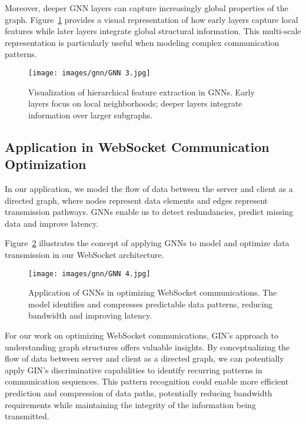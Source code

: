 \documentclass[a4paper, 11pt, twoside, openright]{report}
\begin{document}
Moreover, deeper GNN layers can capture increasingly global properties of the graph. Figure~\ref{fig:gnn_structural} provides a visual representation of how early layers capture local features while later layers integrate global structural information. This multi-scale representation is particularly useful when modeling complex communication patterns.

\begin{figure}[h!]
    \centering
    \texttt{[image: images/gnn/GNN 3.jpg]}
    \caption{Visualization of hierarchical feature extraction in GNNs. Early layers focus on local neighborhoods; deeper layers integrate information over larger subgraphs.}
    \label{fig:gnn_structural}
\end{figure}

\subsection{Application in WebSocket Communication Optimization}

In our application, we model the flow of data between the server and client as a directed graph, where nodes represent data elements and edges represent transmission pathways. GNNs enable us to detect redundancies, predict missing data and improve latency.

Figure~\ref{fig:gnn_application} illustrates the concept of applying GNNs to model and optimize data transmission in our WebSocket architecture.

\begin{figure}[h!]
    \centering
    \texttt{[image: images/gnn/GNN 4.jpg]}
    \caption{Application of GNNs in optimizing WebSocket communications. The model identifies and compresses predictable data patterns, reducing bandwidth and improving latency.}
    \label{fig:gnn_application}
\end{figure}

For our work on optimizing WebSocket communications, GIN's approach to understanding graph structures offers valuable insights. By conceptualizing the flow of data between server and client as a directed graph, we can potentially apply GIN's discriminative capabilities to identify recurring patterns in communication sequences. This pattern recognition could enable more efficient prediction and compression of data paths, potentially reducing bandwidth requirements while maintaining the integrity of the information being transmitted.
\end{document}
